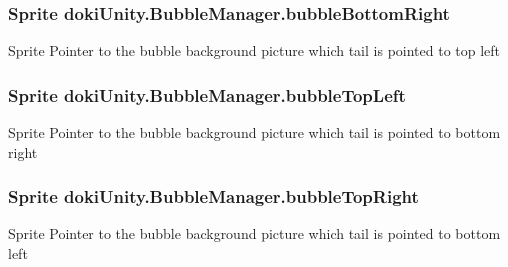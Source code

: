 \subsubsection[{\texorpdfstring{bubble\+Bottom\+Right}{bubbleBottomRight}}]{\setlength{\rightskip}{0pt plus 5cm}Sprite doki\+Unity.\+Bubble\+Manager.\+bubble\+Bottom\+Right}\hypertarget{classdoki_unity_1_1_bubble_manager_ae938e7f1488fcd5c9102b2099ed05e7b}{}\label{classdoki_unity_1_1_bubble_manager_ae938e7f1488fcd5c9102b2099ed05e7b}


Sprite Pointer to the bubble background picture which tail is pointed to top left 

\subsubsection[{\texorpdfstring{bubble\+Top\+Left}{bubbleTopLeft}}]{\setlength{\rightskip}{0pt plus 5cm}Sprite doki\+Unity.\+Bubble\+Manager.\+bubble\+Top\+Left}\hypertarget{classdoki_unity_1_1_bubble_manager_ae3946419cd506ed5cfa4fa6d842be559}{}\label{classdoki_unity_1_1_bubble_manager_ae3946419cd506ed5cfa4fa6d842be559}


Sprite Pointer to the bubble background picture which tail is pointed to bottom right 

\subsubsection[{\texorpdfstring{bubble\+Top\+Right}{bubbleTopRight}}]{\setlength{\rightskip}{0pt plus 5cm}Sprite doki\+Unity.\+Bubble\+Manager.\+bubble\+Top\+Right}\hypertarget{classdoki_unity_1_1_bubble_manager_a86211a4fce86b42ed009c0c0103ff277}{}\label{classdoki_unity_1_1_bubble_manager_a86211a4fce86b42ed009c0c0103ff277}


Sprite Pointer to the bubble background picture which tail is pointed to bottom left 


